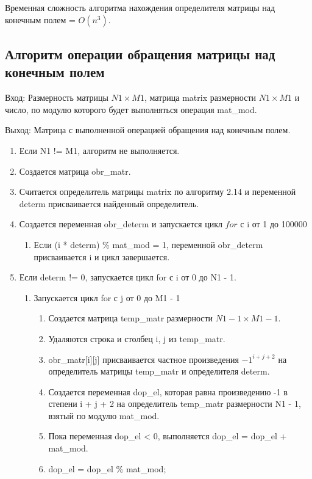 \documentclass[bachelor, och, labwork]{shiza}
\begin{document}
		Временная сложность алгоритма нахождения определителя матрицы над конечным полем = $O(n^3)$.

	\subsection{Алгоритм операции обращения матрицы над конечным полем}
	
			$\textit{Вход:}$ Размерность матрицы $N1 \times M1$, матрица matrix размерности $N1 \times M1$ и число, по модулю которого будет выполняться операция mat\_mod.

			$\textit{Выход:}$  Матрица с выполненной операцией обращения над конечным полем.		
	
		\begin{enumerate} 
			\item Если N1 != M1, алгоритм не выполняется.
			\item Создается матрица obr\_matr.
			\item Считается определитель матрицы matrix по алгоритму 2.14 и переменной determ присваивается найденный определитель.
			\item Создается переменная obr\_determ и запускается цикл $for$ с i от 1 до 100000
				\begin{enumerate} 
					\item Если (i * determ) \% mat\_mod = 1, переменной obr\_determ присваивается i и цикл завершается.
				\end{enumerate}
			\item Если determ != 0, запускается цикл for с i от 0 до N1 - 1.
			\begin{enumerate} 
				\item Запускается цикл for с j от 0 до M1 - 1
				\begin{enumerate} 
					\item Создается матрица temp\_matr размерности $N1 - 1 \times M1 - 1$.
					\item Удаляются строка и столбец i, j из temp\_matr.
					\item obr\_matr[i][j] присваивается частное произведения $-1^{i + j + 2}$ на определитель матрицы temp\_matr и определителя determ. 
					\item Создается переменная dop\_el, которая равна произведению -1 в степени i + j + 2 на определитель temp\_matr размерности N1 - 1, взятый по модулю mat\_mod.
					\item Пока переменная dop\_el < 0, выполняется dop\_el = dop\_el + mat\_mod.
					\item dop\_el = dop\_el \% mat\_mod;

\end{enumerate}
\end{enumerate}
\end{enumerate}
\end{document}
